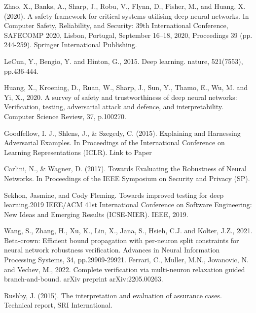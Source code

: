 \label{chp:5}
\begin{singlespace}
\begin{thebibliography}{}


Zhao, X., Banks, A., Sharp, J., Robu, V., Flynn, D., Fisher, M., and Huang, X. (2020). A safety framework for critical systems utilising deep neural networks. In Computer Safety, Reliability, and Security: 39th International Conference, SAFECOMP 2020, Lisbon, Portugal, September 16–18, 2020, Proceedings 39 (pp. 244-259). Springer International Publishing.


LeCun, Y., Bengio, Y. and Hinton, G., 2015. Deep learning. nature, 521(7553), pp.436-444.

Huang, X., Kroening, D., Ruan, W., Sharp, J., Sun, Y., Thamo, E., Wu, M. and Yi, X., 2020. A survey of safety and trustworthiness of deep neural networks: Verification, testing, adversarial attack and defence, and interpretability. Computer Science Review, 37, p.100270.


 Goodfellow, I. J., Shlens, J., \& Szegedy, C. (2015). Explaining and Harnessing Adversarial Examples. In Proceedings of the International Conference on Learning Representations (ICLR). Link to Paper

 Carlini, N., \& Wagner, D. (2017). Towards Evaluating the Robustness of Neural Networks. In Proceedings of the IEEE Symposium on Security and Privacy (SP).
   
 Sekhon, Jasmine, and Cody Fleming. Towards improved testing for deep learning.2019 IEEE/ACM 41st International Conference on Software Engineering: New Ideas and Emerging Results (ICSE-NIER). IEEE, 2019.

Wang, S., Zhang, H., Xu, K., Lin, X., Jana, S., Hsieh, C.J. and Kolter, J.Z., 2021. Beta-crown: Efficient bound propagation with per-neuron split constraints for neural network robustness verification. Advances in Neural Information Processing Systems, 34, pp.29909-29921.
Ferrari, C., Muller, M.N., Jovanovic, N. and Vechev, M., 2022. Complete verification via multi-neuron relaxation guided branch-and-bound. arXiv preprint arXiv:2205.00263.

Rushby, J. (2015). The interpretation and evaluation of assurance cases. Technical report, SRI International.




\end{thebibliography}
\end{singlespace}
